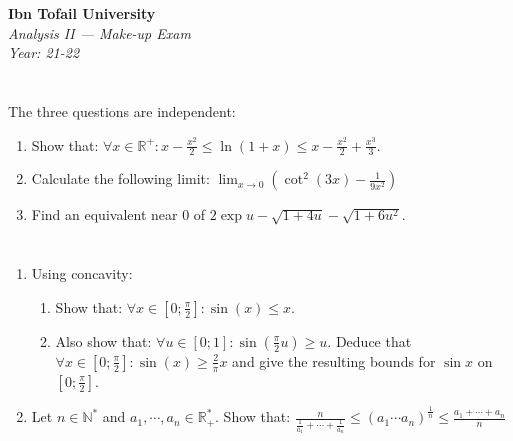 \documentclass[12pt]{article}
\begin{document}
\begin{center}
  \Large\textbf{Ibn Tofail University} \\[1em]
  \large\textit{Analysis II — Make-up Exam} \\[0.5em]
  \large\textit{Year: 21-22} \\[2em]
\end{center}

\vspace{0.5cm}

\section{}
The three questions are independent:
\begin{enumerate}
    \item Show that:
    $\forall x \in \mathbb{R}^+ : x - \frac{x^2}{2} \leq \ln(1 + x) \leq x - \frac{x^2}{2} + \frac{x^3}{3}$.
    
    \item Calculate the following limit:
    $\lim_{x\to 0}\left(\cot^2(3x) - \frac{1}{9x^2}\right)$
    
    \item Find an equivalent near 0 of $2\exp u - \sqrt{1 + 4u} - \sqrt{1 + 6u^2}$.
\end{enumerate}

\newpage

\begin{answerbox}


\end{answerbox}

\newpage

\section{}
\begin{enumerate}
  \item Using concavity:
  \begin{enumerate}
      \item Show that: $\forall x \in [0; \frac{\pi}{2}] : \sin(x) \leq x$.
      
      \item Also show that: $\forall u \in [0; 1] : \sin(\frac{\pi}{2}u) \geq u$. Deduce that $\forall x \in [0; \frac{\pi}{2}] : \sin(x) \geq \frac{2}{\pi}x$ and give the resulting bounds for $\sin x$ on $[0; \frac{\pi}{2}]$.
  \end{enumerate}
  
  \item Let $n \in \mathbb{N}^*$ and $a_1, \cdots, a_n \in \mathbb{R}^*_+$. Show that:
  $\frac{n}{\frac{1}{a_1} + \cdots + \frac{1}{a_n}} \leq (a_1 \cdots a_n)^{\frac{1}{n}} \leq \frac{a_1 + \cdots + a_n}{n}$
\end{enumerate}
\end{document}
